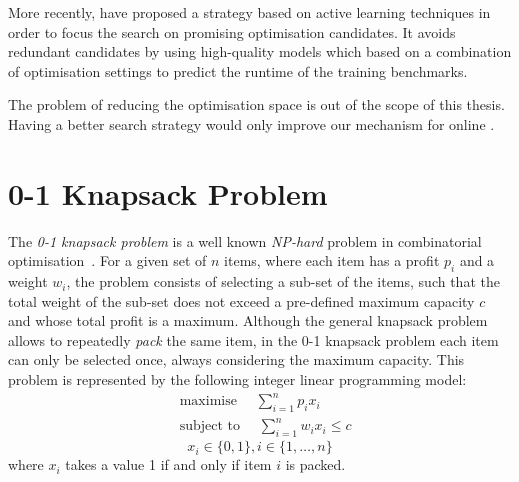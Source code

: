 More recently, \cite{ogilvie17} have proposed a strategy based on active learning techniques in order to focus the search on promising optimisation candidates.
It avoids redundant candidates 
by using high-quality models which based on a combination of optimisation settings to predict the runtime of the training benchmarks.

The problem of reducing the optimisation space is out of the scope of this thesis.
Having a better search strategy would only improve our mechanism for online {\itercomp}.


\section{0-1 Knapsack Problem}

The \textit{0-1 knapsack problem} is a well known \textit{NP-hard} problem in combinatorial optimisation~\cite{martello00}.
For a given set of $n$ items, where each item has a profit $p_i$ and a weight $w_i$, the problem consists of selecting a sub-set of the items, such that the total weight of the sub-set does not exceed a pre-defined maximum capacity $c$ and whose total profit is a maximum.
Although the general knapsack problem allows to repeatedly \textit{pack} the same item, in the 0-1 knapsack problem each item can only be selected once, always considering the maximum capacity.
This problem is represented by the following integer linear programming model:
\begin{equation*}
\begin{aligned}
& \textrm{maximise }\quad \sum_{i=1}^{n} p_ix_i \\
& \textrm{subject to }\quad \sum_{i=1}^{n} w_ix_i \leq c
\end{aligned}
\end{equation*}
\[
x_i\in\{0,1\}, i\in\{1,\ldots,n\}
\]
where $x_i$ takes a value 1 if and only if item $i$ is packed.

